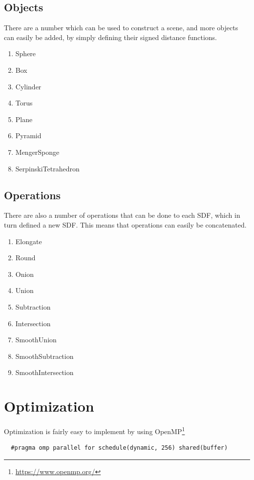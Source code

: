 \documentclass{amsart}
\begin{document}
\subsection{Objects}%
\label{sub:Objects}

There are a number which can be used to construct a scene, and more objects can
easily be added, by simply defining their signed distance functions.

\begin{enumerate}
  \item Sphere
  \item Box
  \item Cylinder
  \item Torus
  \item Plane
  \item Pyramid
  \item MengerSponge
  \item SerpinskiTetrahedron
\end{enumerate}

\subsection{Operations}%
\label{sub:Operations}

There are also a number of operations that can be done to each SDF, which in
turn defined a new SDF. This means that operations can easily be concatenated.

\begin{enumerate}
  \item Elongate
  \item Round
  \item Onion
  \item Union
  \item Subtraction
  \item Intersection
  \item SmoothUnion
  \item SmoothSubtraction
  \item SmoothIntersection
\end{enumerate}

\section{Optimization}%
\label{sec:Optimization}

Optimization is fairly easy to implement by using
OpenMP\footnote{\url{https://www.openmp.org/}}

\begin{verbatim}
  #pragma omp parallel for schedule(dynamic, 256) shared(buffer)
\end{verbatim}
\end{document}
